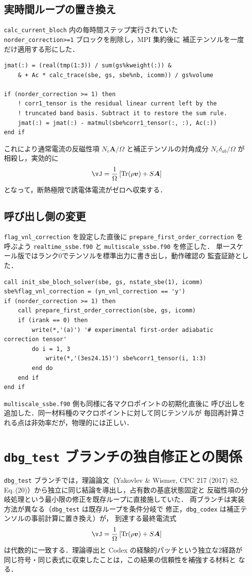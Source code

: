 \documentclass[dvipdfmx,a4paper,11pt]{jsarticle}
\newcommand{\file}[1]{\texttt{#1}}
\newcommand{\vA}{\bm{A}}
\newcommand{\vv}{\bm{v}}
\newcommand{\Tr}{\mathrm{Tr}}
\begin{document}
\subsection{実時間ループの置き換え}
\texttt{calc\_current\_bloch} 内の毎時間ステップ実行されていた
\texttt{norder\_correction>=1} ブロックを削除し，MPI 集約後に
補正テンソルを一度だけ適用する形にした．
\begin{lstlisting}[caption={電流最終化部分の変更後}]
jmat(:) = (real(tmp(1:3)) / sum(gs%kweight(:)) &
    & + Ac * calc_trace(sbe, gs, sbe%nb, icomm)) / gs%volume

if (norder_correction >= 1) then
    ! corr1_tensor is the residual linear current left by the
    ! truncated band basis. Subtract it to restore the sum rule.
    jmat(:) = jmat(:) - matmul(sbe%corr1_tensor(:, :), Ac(:))
end if
\end{lstlisting}
これにより通常電流の反磁性項 $N_e\vA/\Omega$ と補正テンソルの対角成分
$N_e\delta_{ab}/\Omega$ が相殺し，実効的に
\[
  \vJ = \frac{1}{\Omega}\left[\Tr(\rho\vv) + S\vA\right]
\]
となって，断熱極限で誘電体電流がゼロへ収束する．

\subsection{呼び出し側の変更}
\texttt{flag\_vnl\_correction} を設定した直後に
\texttt{prepare\_first\_order\_correction} を呼ぶよう
\file{realtime\_ssbe.f90} と \file{multiscale\_ssbe.f90} を修正した．
単一スケール版ではランク0でテンソルを標準出力に書き出し，動作確認の
監査証跡とした．
\begin{lstlisting}[caption={\file{realtime\_ssbe.f90} の初期化部分}]
call init_sbe_bloch_solver(sbe, gs, nstate_sbe(1), icomm)
sbe%flag_vnl_correction = (yn_vnl_correction == 'y')
if (norder_correction >= 1) then
    call prepare_first_order_correction(sbe, gs, icomm)
    if (irank == 0) then
        write(*,'(a)') '# experimental first-order adiabatic correction tensor'
        do i = 1, 3
            write(*,'(3es24.15)') sbe%corr1_tensor(i, 1:3)
        end do
    end if
end if
\end{lstlisting}
\file{multiscale\_ssbe.f90} 側も同様に各マクロポイントの初期化直後に
呼び出しを追加した．同一材料種のマクロポイントに対して同じテンソルが
毎回再計算される点は非効率だが，物理的には正しい．

\section{\texttt{dbg\_test} ブランチの独自修正との関係}
\texttt{dbg\_test} ブランチでは，理論論文（Yakovlev \& Wismer, CPC 217
(2017) 82, Eq.\,(20)）から独立に同じ結論を導出し，占有数の基底状態固定と
反磁性項の分岐処理という最小限の修正を既存ループに直接施していた．
両ブランチは実装方法が異なる（\texttt{dbg\_test} は既存ループを条件分岐で
修正，\texttt{dbg\_codex} は補正テンソルの事前計算に置き換え）が，
到達する最終電流式
\[
  \vJ = \frac{1}{\Omega}\left[\Tr(\rho\vv) + S\vA\right]
\]
は代数的に一致する．理論導出と Codex の経験的パッチという独立な2経路が
同じ符号・同じ表式に収束したことは，この結果の信頼性を補強する材料と
なる．
\end{document}
